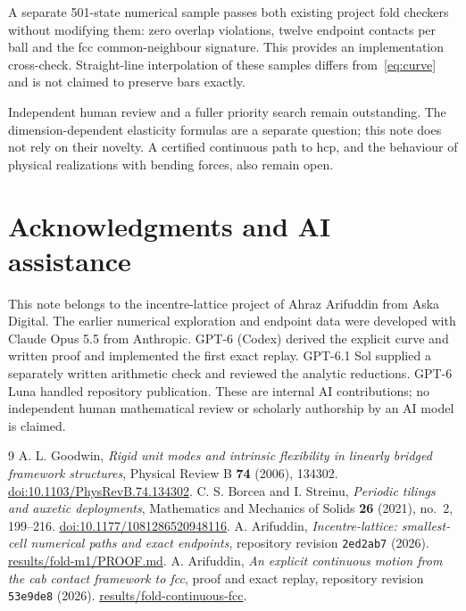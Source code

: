 \documentclass[11pt]{amsart}
\theoremstyle{remark}
\begin{document}
A separate 501-state numerical sample passes both existing project fold checkers without modifying them: zero overlap violations, twelve endpoint contacts per ball and the fcc common-neighbour signature. This provides an implementation cross-check. Straight-line interpolation of these samples differs from~\eqref{eq:curve} and is not claimed to preserve bars exactly.

Independent human review and a fuller priority search remain outstanding. The dimension-dependent elasticity formulas are a separate question; this note does not rely on their novelty. A certified continuous path to hcp, and the behaviour of physical realizations with bending forces, also remain open.

\clearpage
\section*{Acknowledgments and AI assistance}
This note belongs to the incentre-lattice project of Ahraz Arifuddin from Aska Digital. The earlier numerical exploration and endpoint data were developed with Claude Opus 5.5 from Anthropic. GPT-6 (Codex) derived the explicit curve and written proof and implemented the first exact replay. GPT-6.1 Sol supplied a separately written arithmetic check and reviewed the analytic reductions. GPT-6 Luna handled repository publication. These are internal AI contributions; no independent human mathematical review or scholarly authorship by an AI model is claimed.

\begin{thebibliography}{9}
 A. L. Goodwin, \emph{Rigid unit modes and intrinsic flexibility in linearly bridged framework structures}, Physical Review B \textbf{74} (2006), 134302. \href{https://doi.org/10.1103/PhysRevB.74.134302}{doi:10.1103/PhysRevB.74.134302}.
 C. S. Borcea and I. Streinu, \emph{Periodic tilings and auxetic deployments}, Mathematics and Mechanics of Solids \textbf{26} (2021), no.~2, 199--216. \href{https://doi.org/10.1177/1081286520948116}{doi:10.1177/1081286520948116}.
 A. Arifuddin, \emph{Incentre-lattice: smallest-cell numerical paths and exact endpoints}, repository revision \texttt{2ed2ab7} (2026). \href{https://github.com/aska-digital/incentre-lattice/blob/2ed2ab729b2de9e352964f6486bd00dae11a8268/results/fold-m1/PROOF.md}{results/fold-m1/PROOF.md}.
 A. Arifuddin, \emph{An explicit continuous motion from the cab contact framework to fcc}, proof and exact replay, repository revision \texttt{53e9de8} (2026). \href{https://github.com/aska-digital/incentre-lattice/tree/53e9de8/results/fold-continuous-fcc}{results/fold-continuous-fcc}.
\end{thebibliography}
\end{document}
